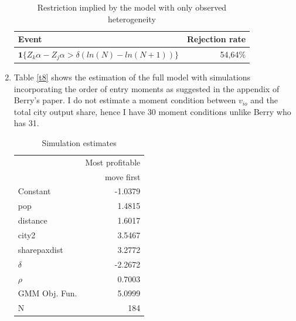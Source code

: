 \documentclass[12pt,english]{article}
\begin{document}
\begin{enumerate}
\begin{table}[H]
  \centering
  \caption{Restriction implied by the model with only observed heterogeneity}
    \begin{tabular}{lr}
    \hline
     Event     & Rejection rate \\
    \hline
    $\mathbf{1}\{Z_{k}\alpha-Z_{j}\alpha>\delta(ln(N)-ln(N+1))\}$ & 54,64\% \\
    \hline
    \end{tabular}%
  \label{t7}%
\end{table}

\item Table \eqref{t8} shows the estimation of the full model with simulations incorporating the order of entry moments as suggested in the appendix of Berry's paper. I do not estimate a moment condition between $v_{io}$ and the total city output share, hence I have 30 moment conditions unlike Berry who has 31.

\begin{table}[H]
  \centering
  \caption{Simulation estimates}
    \begin{tabular}{lr}
    \hline
          & Most profitable \\
          & move first\\
          \hline
    Constant & -1.0379 \\
    pop   & 1.4815 \\
    distance & 1.6017 \\
    city2 & 3.5467 \\
    sharepaxdist & 3.2772 \\
    $\delta$ & -2.2672 \\
    $\rho$   & 0.7003 \\
          \hline
    GMM Obj. Fun. & 5.0999 \\
    N     & 184 \\
    \hline
    \end{tabular}%
  \label{t8}%
\end{table}


\end{enumerate}
\end{document}
